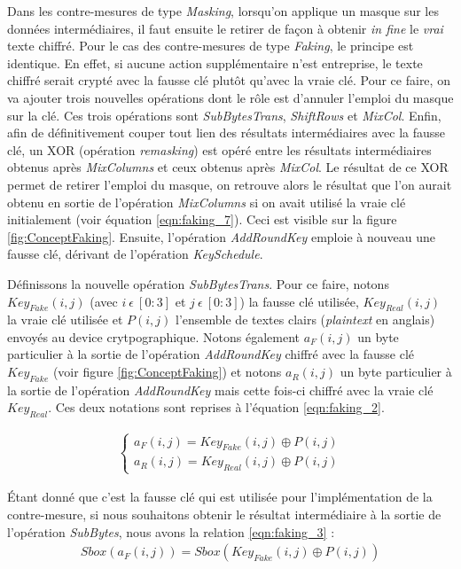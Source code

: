 \documentclass[oneside]{book}
\begin{document}
Dans les contre-mesures de type \textit{Masking}, lorsqu'on applique un masque sur les données intermédiaires, il faut ensuite le retirer de façon à obtenir \textit{in fine} le \textit{vrai} texte chiffré. Pour le cas des contre-mesures de type \textit{Faking}, le principe est identique. En effet, si aucune action supplémentaire n'est entreprise, le texte chiffré serait crypté avec la fausse clé plutôt qu'avec la vraie clé. Pour ce faire, on va ajouter trois nouvelles opérations dont le rôle est d'annuler l'emploi du masque sur la clé. Ces trois opérations sont \textit{SubBytesTrans}, \textit{ShiftRows} et \textit{MixCol}. Enfin, afin de définitivement couper tout lien des résultats intermédiaires avec la fausse clé, un XOR (opération \textit{remasking}) est opéré entre les résultats intermédiaires obtenus après \textit{MixColumns} et ceux obtenus après \textit{MixCol}. Le résultat de ce XOR permet de retirer l'emploi du masque, on retrouve alors le résultat que l'on aurait obtenu en sortie de l'opération \textit{MixColumns} si on avait utilisé la vraie clé initialement (voir équation \ref{eqn:faking_7}). Ceci est visible sur la figure \ref{fig:ConceptFaking}. Ensuite, l'opération \textit{AddRoundKey} emploie à nouveau une fausse clé, dérivant de l'opération \textit{KeySchedule}.

Définissons la nouvelle opération \textit{SubBytesTrans}. Pour ce faire, notons $Key_{Fake}(i,j)$ (avec $i \ \epsilon \ [0:3]$ et $j \ \epsilon \ [0:3]$) la fausse clé utilisée, $Key_{Real}(i,j)$ la vraie clé utilisée et $P(i,j)$ l'ensemble de textes clairs (\textit{plaintext} en anglais) envoyés au device crytpographique. Notons également $a_{F}(i,j)$ un byte particulier à la sortie de l'opération \textit{AddRoundKey} chiffré avec la fausse clé $Key_{Fake}$ (voir figure \ref{fig:ConceptFaking}) et notons $a_{R}(i,j)$ un byte particulier à la sortie de l'opération \textit{AddRoundKey} mais cette fois-ci chiffré avec la vraie clé $Key_{Real}$. Ces deux notations sont reprises à l'équation \ref{eqn:faking_2}.

\begin{gather}
	\left\{\begin{matrix}
	a_{F}(i,j) = Key_{Fake}(i,j) \oplus P(i,j) \\ 
	a_{R}(i,j) = Key_{Real}(i,j) \oplus P(i,j)
	\end{matrix}\right.\label{eqn:faking_2}
\end{gather}

\hspace{-0.5cm}Étant donné que c'est la fausse clé qui est utilisée pour l'implémentation de la contre-mesure, si nous souhaitons obtenir le résultat intermédiaire à la sortie de l'opération \textit{SubBytes}, nous avons la relation \ref{eqn:faking_3} :
\begin{gather}
	Sbox(a_{F}(i,j)) = Sbox(Key_{Fake}(i,j) \oplus P(i,j))\label{eqn:faking_3}
\end{gather}
\end{document}

